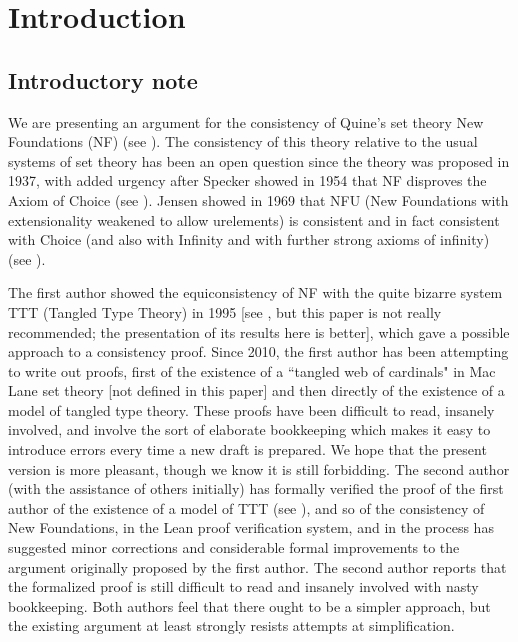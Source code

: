 \documentclass{article}
\theoremstyle{definition}
\theoremstyle{remark}
\begin{document}
{

\tableofcontents

\newpage

\section{Introduction}



\subsection{Introductory note}

We are presenting an argument for the consistency of Quine's set theory New Foundations (NF) (see \cite{nf}).  The consistency of this theory relative to the usual systems of set theory has been an open question since the theory was proposed in 1937, with added urgency after Specker showed in 1954 that NF disproves the Axiom of Choice (see \cite{notac}).
Jensen showed in 1969 that NFU (New Foundations with extensionality weakened to allow urelements) is consistent and in fact consistent with Choice (and also with Infinity and with further strong axioms of infinity) (see \cite{nfu}).

The first author showed the equiconsistency of NF with the quite bizarre system TTT (Tangled Type Theory) in 1995 [see \cite{tangled}, but this paper is not really recommended; the presentation of its results here is better], which gave a possible approach to a consistency proof.  Since 2010, the first author has been attempting to write out proofs, first of the existence of a ``tangled web of cardinals" in Mac Lane set theory [not defined in this paper] and then directly of the existence of a model of tangled type theory.  These proofs have been  difficult to read, insanely involved, and involve the sort of elaborate bookkeeping which makes it easy to introduce errors every time a new draft is prepared.  We hope that the present version is more pleasant, though we know it is still forbidding.  The second author (with the assistance of others initially)
has formally verified the proof of the first author of the existence of a model of TTT (see \cite{wilshaw}), and so of the consistency of New Foundations, in the Lean proof verification system, and in the process has suggested minor corrections and considerable formal improvements to the argument originally proposed by the first author.  The second author reports that the formalized proof is still difficult to read and insanely involved with nasty bookkeeping.  Both authors feel that there ought to be a simpler approach, but the existing argument at least strongly resists attempts at simplification.

}
\end{document}
